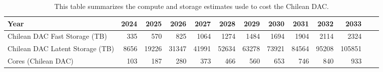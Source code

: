 \tiny \begin{longtable} { |p{}  |r  |r  |r  |r  |r  |r  |r  |r  |r  |r  |r  |r |} 
\caption{This table summarizes the compute and storage estimates usde to cost the Chilean DAC. \label{tab:chileDac}}\\ 
\hline 
\textbf{Year}&\textbf{2024}&\textbf{2025}&\textbf{2026}&\textbf{2027}&\textbf{2028}&\textbf{2029}&\textbf{2030}&\textbf{2031}&\textbf{2032}&\textbf{2033}& \\ \hline
{Chilean DAC Fast Storage (TB)}&{335}&{570}&{825}&{1064}&{1274}&{1484}&{1694}&{1904}&{2114}&{2324}&{ } \\ \hline
{Chilean DAC Latent Storage (TB)}&{8656}&{19226}&{31347}&{41991}&{52634}&{63278}&{73921}&{84564}&{95208}&{105851}& \\ \hline
{Cores (Chilean DAC)}&{103}&{187}&{280}&{373}&{466}&{560}&{653}&{746}&{840}&{933}& \\ \hline
\end{longtable} \normalsize
